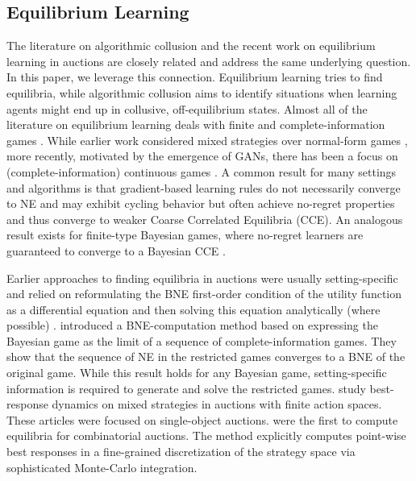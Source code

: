 \documentclass{article}
\begin{document}
\subsection{Equilibrium Learning}
\label{sec:learning}
The literature on algorithmic collusion and the recent work on equilibrium learning in auctions are closely related and address the same underlying question. In this paper, we leverage this connection. Equilibrium learning tries to find equilibria, while algorithmic collusion aims to identify situations when learning agents might end up in collusive, off-equilibrium states. 
Almost all of the literature on equilibrium learning deals with finite and complete-information games \citep{fudenbergLearningEquilibrium2009}. 
While earlier work considered mixed strategies over normal-form games \citep{zinkevich2003OnlineConvexProgramming,bowling2002MultiagentLearningUsing,bowling2005ConvergenceNoRegretMultiagent,busoniu2008ComprehensiveSurveyMultiagent}, more recently, motivated by the emergence of GANs, there has been a focus on (complete-information) continuous games \citep{mertikopoulos2019learning,letcher2019DifferentiableGameMechanics,balduzzi2018mechanics,schaefer2019CompetitiveGradientDescent, bailey2018MultiplicativeWeightsUpdate}. A common result for many settings and algorithms is that gradient-based learning rules do not necessarily converge to NE and may exhibit cycling behavior but often achieve no-regret properties and thus converge to weaker Coarse Correlated Equilibria (CCE). An analogous result exists for finite-type Bayesian games, where no-regret learners are guaranteed to converge to a Bayesian CCE \citep{hartline2015NoRegretLearningBayesian}.


Earlier approaches to finding equilibria in auctions were usually setting-specific and relied on reformulating the BNE first-order condition of the utility function as a differential equation and then solving this equation analytically (where possible) \citep{vickrey1961CounterspeculationAuctionsCompetitive,krishna2009auction,ausubel2019CoreselectingAuctionsIncomplete}. \citet{armantier2008ApproximationNashEquilibria} introduced a BNE-computation method based on expressing the Bayesian game as the limit of a sequence of complete-information games. They show that the sequence of NE in the restricted games converges to a BNE of the original game. While this result holds for any Bayesian game, setting-specific information is required to generate and solve the restricted games. \citet{rabinovich2013ComputingPureBayesianNash} study best-response dynamics on mixed strategies in auctions with finite action spaces. 
These articles were focused on single-object auctions. \citet{bosshard2017computing,bosshardComputingBayesNashEquilibria2020} were the first to compute equilibria for combinatorial auctions. The method explicitly computes point-wise best responses in a fine-grained discretization of the strategy space via sophisticated Monte-Carlo integration. 
\end{document}
